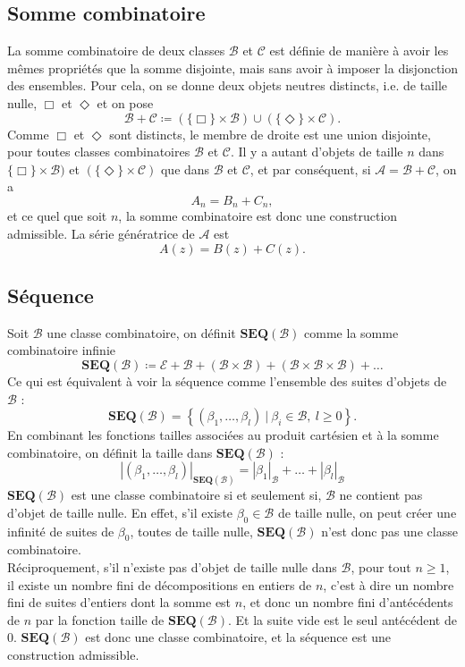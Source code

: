 \documentclass[12pt]{report}
\begin{document}
\subsection*{Somme combinatoire}
La somme combinatoire de deux classes $\mathcal B$ et $\mathcal C$ est définie de manière à avoir les mêmes propriétés que la somme disjointe, mais sans avoir à imposer la disjonction des ensembles. Pour cela, on se donne deux objets neutres distincts, i.e. de taille nulle, $\Box$ et $\Diamond$ et on pose
$$\mathcal B + \mathcal C \coloneqq (\{\Box\} \times\mathcal B) \cup (\{\Diamond\} \times\mathcal C).$$
Comme $\Box$ et $\Diamond$ sont distincts, le membre de droite est une union disjointe, pour toutes classes combinatoires $\mathcal B$ et $\mathcal C$.
Il y a autant d'objets de taille $n$ dans $\{\Box\} \times\mathcal B)$ et $(\{\Diamond\} \times\mathcal C)$ que dans $\mathcal B$ et $\mathcal C$, et par conséquent, si $\mathcal A = \mathcal B + \mathcal C $, on a 
$$A_n = B_n + C_n,$$ et ce quel que soit $n$, la somme combinatoire est donc une construction admissible.
La série génératrice de $\mathcal A$ est 
$$A(z)=B(z)+C(z).$$

\subsection*{Séquence}
Soit $\mathcal B$ une classe combinatoire, on définit $\mathbf{SEQ} (\mathcal B)$ comme la somme combinatoire infinie 
$$\mathbf{SEQ} (\mathcal B) \coloneqq\mathcal E + \mathcal B + (\mathcal B \times \mathcal B) +(\mathcal B \times \mathcal B \times \mathcal B) + \dots$$
Ce qui est équivalent à voir la séquence comme l'ensemble des suites d'objets de $\mathcal B$ : 
$$\mathbf{SEQ}(\mathcal B) = \left\{ (\beta_1,\dots,\beta_l)\ |\ \beta_i \in \mathcal B,\ l\geqslant 0\right\}.$$
En combinant les fonctions tailles associées au produit cartésien et à la somme combinatoire, on définit la taille dans $\mathbf{SEQ}(\mathcal B)$ : 
$$|(\beta_1,\dots,\beta_l)|_{\mathbf{SEQ}(\mathcal B)} = |\beta_1|_{\mathcal B}+\dots+|\beta_l|_{\mathcal B}$$
$\mathbf{SEQ}(\mathcal B)$ est une classe combinatoire si et seulement si, $\mathcal B$ ne contient pas d'objet de taille nulle. 
En effet, s'il existe $\beta_0 \in \mathcal B$ de taille nulle, on peut créer une infinité de suites de $\beta_0$, toutes de taille nulle, $\mathbf{SEQ}(\mathcal B)$ n'est donc pas une classe combinatoire. \\
Réciproquement, s'il n'existe pas d'objet de taille nulle dans $\mathcal B$, pour tout $n\geqslant 1$, il existe un nombre fini de décompositions en entiers de $n$, c'est à dire un nombre fini de suites d'entiers dont la somme est $n$, et donc un nombre fini d'antécédents de $n$ par la fonction taille de $\mathbf{SEQ}(\mathcal B)$. Et la suite vide est le seul antécédent de $0$. $\mathbf{SEQ}(\mathcal B)$ est donc une classe combinatoire, et la séquence est une construction admissible.
\end{document}
